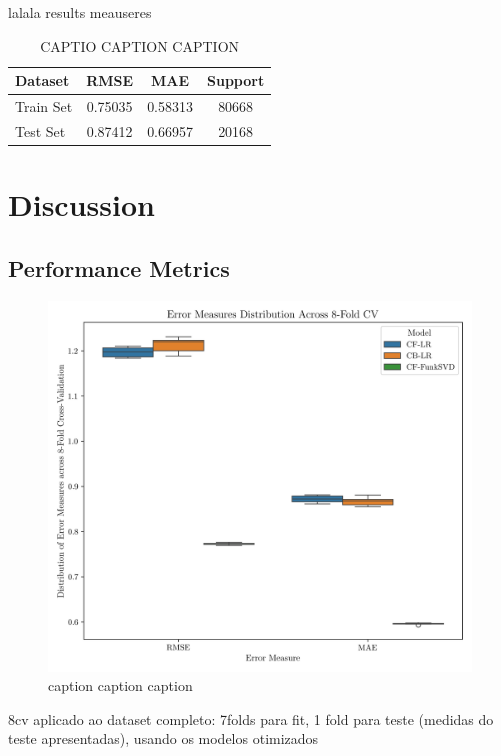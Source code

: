 \documentclass[conference]{IEEEtran}
\begin{document}
lalala results meauseres

\begin{table}[H]
\centering
\caption{CAPTIO CAPTION CAPTION}
\label{tab:model03_results}
\begin{tabular}{lccc}
\toprule
\textbf{Dataset} & \textbf{RMSE} & \textbf{MAE} & \textbf{Support} \\
\midrule
Train Set & 0.75035 & 0.58313 & 80668 \\
Test Set & 0.87412 & 0.66957 & 20168 \\
\bottomrule
\end{tabular}
\end{table}


\section{Discussion} 

\subsection{Performance Metrics}

\begin{figure}[H]
    \centering
    \includegraphics[width=1\linewidth]{assets/results_boxplot.png}
    \caption{caption caption caption}
    \label{fig:results_boxplot}
\end{figure}

8cv aplicado ao dataset completo: 7folds para fit, 1 fold para teste (medidas do teste apresentadas), usando os modelos otimizados
\end{document}
